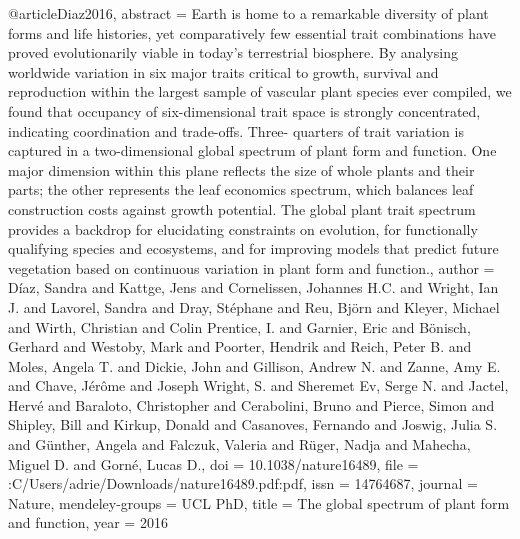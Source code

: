 {@article{Diaz2016,
abstract = {Earth is home to a remarkable diversity of plant forms and life histories, yet comparatively few essential trait combinations have proved evolutionarily viable in today's terrestrial biosphere. By analysing worldwide variation in six major traits critical to growth, survival and reproduction within the largest sample of vascular plant species ever compiled, we found that occupancy of six-dimensional trait space is strongly concentrated, indicating coordination and trade-offs. Three- quarters of trait variation is captured in a two-dimensional global spectrum of plant form and function. One major dimension within this plane reflects the size of whole plants and their parts; the other represents the leaf economics spectrum, which balances leaf construction costs against growth potential. The global plant trait spectrum provides a backdrop for elucidating constraints on evolution, for functionally qualifying species and ecosystems, and for improving models that predict future vegetation based on continuous variation in plant form and function.},
author = {D{\'{i}}az, Sandra and Kattge, Jens and Cornelissen, Johannes H.C. and Wright, Ian J. and Lavorel, Sandra and Dray, St{\'{e}}phane and Reu, Bj{\"{o}}rn and Kleyer, Michael and Wirth, Christian and {Colin Prentice}, I. and Garnier, Eric and B{\"{o}}nisch, Gerhard and Westoby, Mark and Poorter, Hendrik and Reich, Peter B. and Moles, Angela T. and Dickie, John and Gillison, Andrew N. and Zanne, Amy E. and Chave, J{\'{e}}r{\^{o}}me and {Joseph Wright}, S. and {Sheremet Ev}, Serge N. and Jactel, Herv{\'{e}} and Baraloto, Christopher and Cerabolini, Bruno and Pierce, Simon and Shipley, Bill and Kirkup, Donald and Casanoves, Fernando and Joswig, Julia S. and G{\"{u}}nther, Angela and Falczuk, Valeria and R{\"{u}}ger, Nadja and Mahecha, Miguel D. and Gorn{\'{e}}, Lucas D.},
doi = {10.1038/nature16489},
file = {:C\:/Users/adrie/Downloads/nature16489.pdf:pdf},
issn = {14764687},
journal = {Nature},
mendeley-groups = {UCL PhD},
title = {{The global spectrum of plant form and function}},
year = {2016}
}

}
